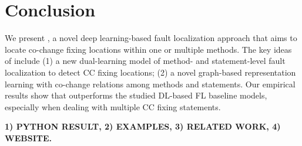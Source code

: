 \section{Conclusion}

We present {\tool}, a novel deep learning-based fault localization
approach that aims to locate co-change fixing locations within one or
multiple methods. The key ideas of {\tool} include (1) a new
dual-learning model of method- and statement-level fault localization
to detect CC fixing locations; (2) a novel graph-based representation
learning with co-change relations among methods and statements. Our
empirical results show that {\tool} outperforms the studied DL-based
FL baseline models, especially when dealing with multiple CC fixing
statements.

{\bf 1) PYTHON RESULT, 2) EXAMPLES, 3) RELATED WORK, 4) WEBSITE.}

